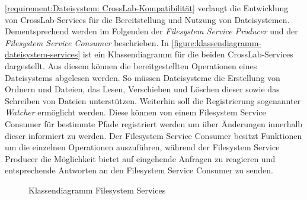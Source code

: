 \autoref{requirement:Dateisystem: CrossLab-Kompatibilität} verlangt die Entwicklung von CrossLab-Services für die Bereitstellung und Nutzung von Dateisystemen. Dementsprechend werden im Folgenden der \textit{Filesystem Service Producer} und der \textit{Filesystem Service Consumer} beschrieben. In \autoref{figure:klassendiagramm-dateisystem-services} ist ein Klassendiagramm für die beiden CrossLab-Services dargestellt. Aus diesem können die bereitgestellten Operationen eines Dateisystems abgelesen werden. So müssen Dateisysteme die Erstellung von Ordnern und Dateien, das Lesen, Verschieben und Löschen dieser sowie das Schreiben von Dateien unterstützen. Weiterhin soll die Registrierung sogenannter \textit{Watcher} ermöglicht werden. Diese können von einem Filesystem Service Consumer für bestimmte Pfade registriert werden um über Änderungen innerhalb dieser informiert zu werden. Der Filesystem Service Consumer besitzt Funktionen um die einzelnen Operationen auszuführen, während der Filesystem Service Producer die Möglichkeit bietet auf eingehende Anfragen zu reagieren und entsprechende Antworten an den Filesystem Service Consumer zu senden.

\begin{figure}[tbp]
    \centering
    \caption{Klassendiagramm Filesystem Services}
    \label{figure:klassendiagramm-dateisystem-services}
\end{figure}

